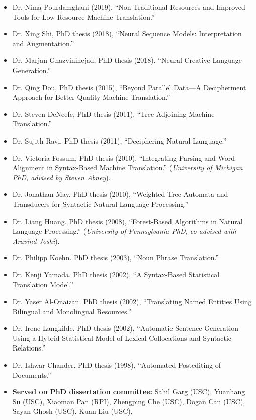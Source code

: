 \begin{itemize}
\item Dr. Nima Pourdamghani (2019),
``Non-Traditional Resources and Improved Tools for Low-Resource
Machine Translation.''
\item Dr. Xing Shi, PhD thesis (2018),
``Neural Sequence Models: Interpretation and Augmentation.''
\item Dr. Marjan Ghazvininejad, PhD thesis (2018),
``Neural Creative Language Generation.''
\item Dr. Qing Dou, PhD thesis (2015),
``Beyond Parallel Data---A Decipherment Approach for Better Quality
Machine Translation.''
\item Dr. Steven DeNeefe, PhD thesis (2011),
``Tree-Adjoining Machine Translation.''
\item Dr. Sujith Ravi, PhD thesis (2011),
``Deciphering Natural Language.''
\item Dr. Victoria Fossum, PhD thesis (2010),
``Integrating Parsing and Word Alignment in Syntax-Based Machine Translation.''
({\em University of Michigan PhD, advised by Steven Abney}).
\item Dr. Jonathan May.  PhD thesis (2010),
``Weighted Tree Automata and Transducers for
Syntactic Natural Language Processing.''
\item Dr. Liang Huang.  PhD thesis (2008),
``Forest-Based Algorithms in Natural Language Processing.''
({\em University of Pennsylvania PhD, co-advised with Aravind Joshi}).
\item Dr. Philipp Koehn.  PhD thesis (2003),
``Noun Phrase Translation.''  
\item Dr. Kenji Yamada. PhD thesis (2002),
``A Syntax-Based Statistical Translation Model.''
\item Dr. Yaser Al-Onaizan. PhD thesis (2002),
``Translating Named Entities Using Bilingual and 
Monolingual Resources.''
\item Dr. Irene Langkilde. PhD thesis (2002),
``Automatic Sentence Generation Using a Hybrid Statistical Model of 
Lexical Collocations and Syntactic Relations.''
\item Dr. Ishwar Chander. PhD thesis (1998), 
``Automated Postediting of Documents.''
\item {\bf Served on PhD dissertation committee:}
Sahil Garg (USC),
Yuanhang Su (USC),
Xiaoman Pan (RPI),
Zhengping Che (USC),
Dogan Can (USC),
Sayan Ghosh (USC),
Kuan Liu (USC),

\end{itemize}
